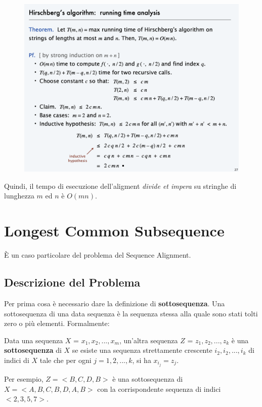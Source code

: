 \begin{figure}[H]
	\centering
	\includegraphics[width=12cm, keepaspectratio]{capitoli/programmazione_dinamica/imgs/hirschberg.png}
\end{figure}

Quindi, il tempo di esecuzione dell'aligment \emph{divide et impera} su
stringhe di lunghezza $m$ ed $n$ è $O(mn)$.


\section{Longest Common Subsequence}

È un caso particolare del problema del Sequence Alignment.

\subsection{Descrizione del Problema}

Per prima cosa è necessario dare la definizione di
\textbf{sottosequenza}. Una sottosequenza di una data sequenza è la
sequenza stessa alla quale sono stati tolti zero o più elementi.
Formalmente:
\begin{myblockquote}
	Data una sequenza $X$ =
	$x_1, x_2, ..., x_m$, un'altra sequenza $Z$ = $z_1, z_2, ..., z_k$
	è una \textbf{sottosequenza} di $X$ se esiste una sequenza
	strettamente crescente $i_2, i_2, ..., i_k$ di indici di $X$ tale
	che per ogni $j = 1, 2, ..., k$, si ha $x_{i_j} = z_j$.
\end{myblockquote}


Per esempio, $Z = <B, C, D, B>$ è una sottosequenza di
$X = < A, B, C, B, D, A, B>$ con la corrispondente sequenza di indici
$<2, 3, 5, 7>$.\\

